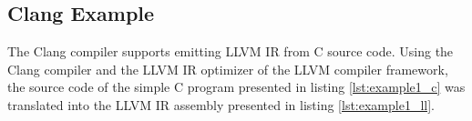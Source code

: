 
\subsection{Clang Example}
\label{app:clang_example}

The Clang compiler supports emitting LLVM IR from C source code. Using the Clang compiler and the LLVM IR optimizer of the LLVM compiler framework, the source code of the simple C program presented in listing \ref{lst:example1_c} was translated into the LLVM IR assembly presented in listing \ref{lst:example1_ll}.




